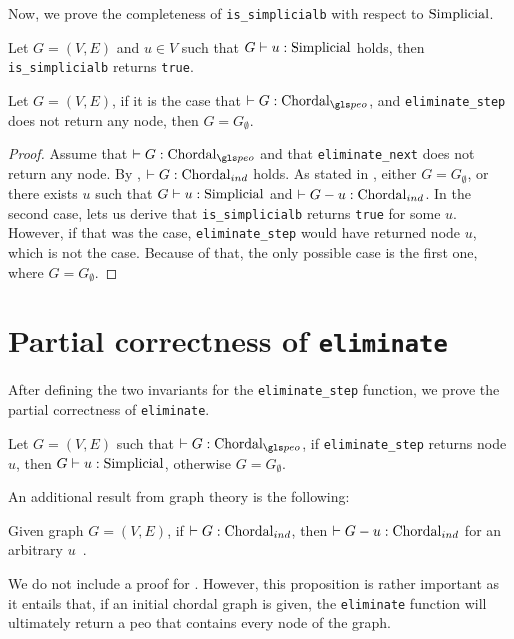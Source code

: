 Now, we prove the completeness of \texttt{is\_simplicialb} with respect to $\simplicialsymbol$.

\begin{lemma}\label{lem:sbcomp}
Let $G = (V, E)$ and $u \in V$ such that $\simplicial{u}{G}$ holds, then \texttt{is\_simplicialb} returns \texttt{true}. \Coqed
\end{lemma}

\begin{lemma}\label{lem:inv-elim-2}
    Let $G = (V, E)$, if it is the case that $\chordalpeo{G}$, and \texttt{eliminate\_step} does not return any node, then $G = G_\emptyset$. \Coqed
\end{lemma}
\begin{proof}
    Assume that $\chordalpeo{G}$ and that \texttt{eliminate\_next} does not return any node. By , $\chordalind{G}$ holds. As stated in , either $G = G_\emptyset$, or there exists $u$ such that $\simplicial{u}{G}$ and $\chordalind{G - u}$. In the second case,  lets us derive that \texttt{is\_simplicialb} returns \texttt{true} for some $u$. However, if that was the case, \texttt{eliminate\_step} would have returned node $u$, which is not the case. Because of that, the only possible case is the first one, where $G = G_\emptyset$.
\end{proof}

\section{Partial correctness of \texttt{eliminate}}

After defining the two invariants for the \texttt{eliminate\_step} function, we prove the partial correctness of \texttt{eliminate}.

\begin{theorem}\label{thm:par-cor}
    Let $G = (V, E)$ such that $\chordalpeo{G}$, if \texttt{eliminate\_step} returns node $u$, then $\simplicial{u}{G}$, otherwise $G = G_\emptyset$. \Coqed
\end{theorem}

An additional result from graph theory is the following:

\begin{theorem}\label{thm:cho-inv}
    Given graph $G = (V, E)$, if $\chordalind{G}$, then $\chordalind{G - u}$ for an arbitrary $u$~\cite{golumbic2004algorithmic}.
\end{theorem}

We do not include a proof for . However, this proposition is rather important as it entails that, if an initial chordal graph is given, the \texttt{eliminate} function will ultimately return a \gls{peo} that contains every node of the graph.